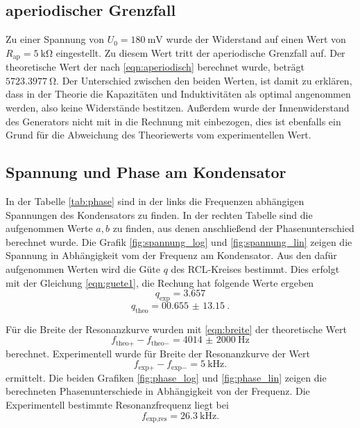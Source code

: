 \FloatBarrier

\subsection{aperiodischer Grenzfall}
Zu einer Spannung von $U_0 = \SI{180}{\milli\V}$ wurde der Widerstand auf einen Wert von $R_\text{ap} = \SI{5}{\kilo\ohm}$ eingestellt.
Zu diesem Wert tritt der aperiodische Grenzfall auf. Der theoretische Wert der nach \eqref{eqn:aperiodisch} berechnet wurde, beträgt $\SI{5723.3977}{\ohm}$.
Der Unterschied zwischen den beiden Werten, ist damit zu erklären, dass in der Theorie die Kapazitäten und Induktivitäten als optimal angenommen werden, also keine Widerstände bestitzen.
Außerdem wurde der Innenwiderstand des Generators nicht mit in die Rechnung mit einbezogen, dies ist ebenfalls ein Grund für die Abweichung des Theoriewerts vom experimentellen Wert.

\FloatBarrier  
\subsection{Spannung und Phase am Kondensator}
In der Tabelle \ref{tab:phase} sind in der links die Frequenzen abhängigen Spannungen des Kondensators zu finden.
In der rechten Tabelle sind die aufgenommen Werte $a, b$ zu finden, aus denen anschließend der Phasenunterschied berechnet wurde.
Die Grafik \ref{fig:spannung_log} und \ref{fig:spannung_lin} zeigen die Spannung in Abhängigkeit vom der Frequenz am Kondensator.
Aus den dafür aufgenommen Werten wird die Güte $q$ des RCL-Kreises bestimmt.
Dies erfolgt mit der Gleichung \eqref{eqn:guete1}, die Rechung hat folgende Werte ergeben
\begin{equation*}
    q_\text{exp} = 3.657
\end{equation*}
\begin{equation*}
    q_\text{theo} =  \SI{00.655(13150)}{}.
\end{equation*}

Für die Breite der Resonanzkurve wurden mit \eqref{eqn:breite} der theoretische Wert 
\begin{equation*}
    f_{\text{theo}+}- f_{\text{theo}-} = \SI{4014(2000)}{\hertz}
\end{equation*}
berechnet.
Experimentell wurde für Breite der Resonanzkurve der Wert 
\begin{equation*}
    f_{\text{exp}+}-f_{\text{exp}-} = \SI{5}{\kilo\hertz}.
\end{equation*}
ermittelt.
Die beiden Grafiken \ref{fig:phase_log} und \ref{fig:phase_lin} zeigen die berechneten Phasenunterschiede in Abhängigkeit von der Frequenz.
Die Experimentell bestimmte Resonanzfrequenz liegt bei 
\begin{equation*}
    f_{\text{exp},\text{res}} = \SI{26.3}{\kilo\hertz}.
\end{equation*}

